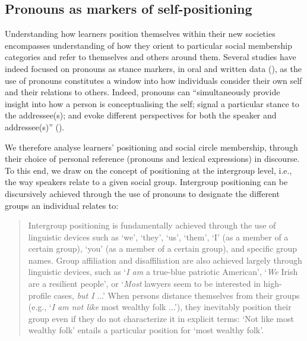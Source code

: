\documentclass[output=paper]{langscibook}
\begin{document}
\subsection{Pronouns as markers of self-positioning} %

Understanding how learners position themselves within their new societies encompasses understanding of how they orient to particular social membership categories and refer to themselves and others around them. Several studies have indeed focused on pronouns as stance markers, in oral and written data (\citealt{vanHellEtAl2005, Langhans1996, Hidalgo-DowningEtAl2014, Moskowich2017}), as the use of pronouns constitutes a window into how individuals consider their own self and their relations to others. Indeed, pronouns can “simultaneously provide insight into how a person is conceptualising the self; signal a particular stance to the addressee(s); and evoke different perspectives for both the speaker and addressee(s)” (\citealt[2]{OrvelEtAl2022}).

\begin{sloppypar}
We therefore analyse learners’ positioning and social circle membership, through their choice of personal reference (pronouns and lexical expressions) in discourse. To this end, we draw on the concept of positioning at the intergroup level, i.e., the way speakers relate to a given social group. Intergroup positioning can be discursively achieved through the use of pronouns to designate the different groups an individual relates to: 
\end{sloppypar}

\begin{quote}
Intergroup positioning is fundamentally achieved through the use of linguistic devices such as `we', `they', `us', `them', `I' (as a member of a certain group), `you' (as a member of a certain group), and specific group names. Group affiliation and disaffiliation are also achieved largely through linguistic devices, such as ‘\textit{I am} a true-blue patriotic American', `\textit{We} Irish are a resilient people', or `\textit{Most} lawyers seem to be interested in high-profile cases, \textit{but I} ...' When persons distance themselves from their groups (e.g., `\textit{I am not like} most wealthy folk ...'), they inevitably position their group even if they do not characterize it in explicit terms: `Not like most wealthy folk' entails a particular position for `most wealthy folk'. \hbox{}\hfill\hbox{\citep[183]{TanMoghaddam1999}}
\end{quote}
\end{document}
